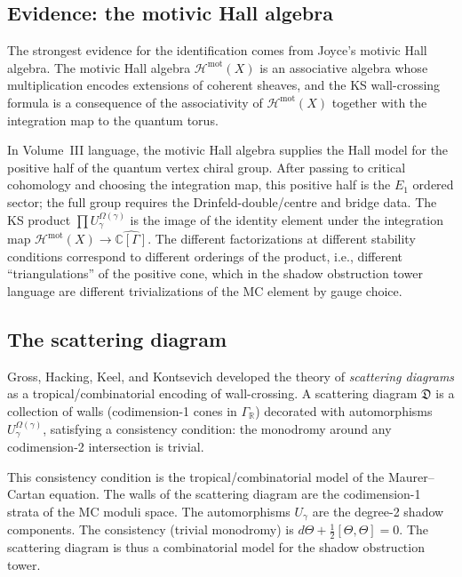 \documentclass[11pt]{article}
\theoremstyle{definition}
\newcommand{\bR}{\mathbb{R}}
\newcommand{\bC}{\mathbb{C}}
\begin{document}
\subsection{Evidence: the motivic Hall algebra}

The strongest evidence for the identification comes from
Joyce's motivic Hall algebra. The motivic Hall algebra
$\mathcal{H}^{\mathrm{mot}}(X)$ is an associative algebra whose
multiplication encodes extensions of coherent sheaves, and the
KS wall-crossing formula is a consequence of the associativity of
$\mathcal{H}^{\mathrm{mot}}(X)$ together with the integration
map to the quantum torus.

In Volume~III language, the motivic Hall algebra supplies the Hall
model for the positive half of the quantum vertex chiral group. After
passing to critical cohomology and choosing the integration map, this
positive half is the $E_1$ ordered sector; the full group requires the
Drinfeld-double/centre and bridge data. The KS product
$\prod U_\gamma^{\Omega(\gamma)}$ is
the image of the identity element under the integration map
$\mathcal{H}^{\mathrm{mot}}(X) \to \widehat{\bC[\Gamma]}$. The
different factorizations at different stability conditions correspond
to different orderings of the product, i.e., different
``triangulations'' of the positive cone, which in the shadow obstruction tower
language are different trivializations of the MC element by gauge
choice.

\subsection{The scattering diagram}

Gross, Hacking, Keel, and Kontsevich developed the theory of
\emph{scattering diagrams} as a tropical/combinatorial encoding of
wall-crossing. A scattering diagram $\mathfrak{D}$ is a collection
of walls (codimension-1 cones in $\Gamma_\bR$) decorated with
automorphisms $U_\gamma^{\Omega(\gamma)}$, satisfying a consistency
condition: the monodromy around any codimension-2 intersection is
trivial.

This consistency condition is the tropical/combinatorial model of the
Maurer--Cartan equation. The walls
of the scattering diagram are the codimension-1 strata of the MC
moduli space. The automorphisms $U_\gamma$ are the degree-2 shadow
components. The consistency (trivial monodromy) is $d\Theta +
\frac{1}{2}[\Theta,\Theta] = 0$. The scattering diagram is thus a
combinatorial model for the shadow obstruction tower.
\end{document}
